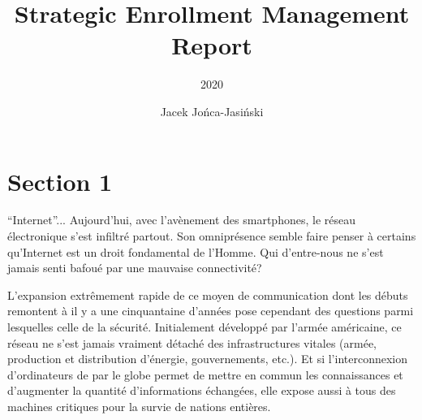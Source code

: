 \documentclass[article]{yReport}
\author{Jacek Jońca-Jasiński}
\title{Strategic Enrollment Management Report}
\subtitle{2020}
\begin{document}
	
	\startcontents
	\printMarginPartialToc[1][Contents]
	
	\section{Section 1}
	\enquote{Internet}...
	Aujourd'hui, avec l'avènement des smartphones, le réseau électronique s'est infiltré partout.
	Son omniprésence semble faire penser à certains qu'Internet est un droit fondamental de l'Homme.
	Qui d'entre-nous ne s'est jamais senti bafoué par une mauvaise connectivité?
	
	L'expansion extrêmement rapide de ce moyen de communication dont les débuts remontent à il y a une cinquantaine d'années%
	pose cependant des questions parmi lesquelles celle de la sécurité.
	Initialement développé par l'armée américaine, ce réseau ne s'est jamais vraiment détaché des infrastructures vitales (armée, production et distribution d'énergie, gouvernements, etc.).
	Et si l'interconnexion d'ordinateurs de par le globe permet de mettre en commun les connaissances et d'augmenter la quantité d'informations échangées, elle expose aussi à tous des machines critiques pour la survie de nations entières.
	
\end{document}
